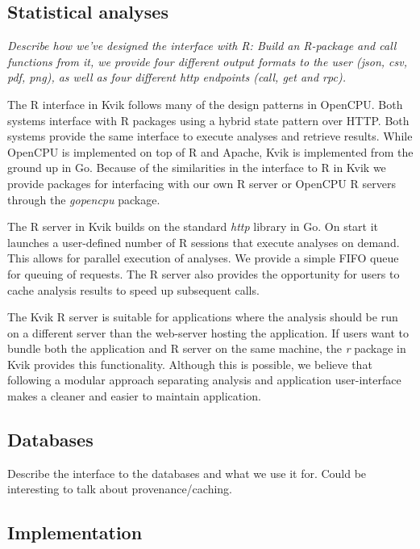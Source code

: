 \subsection*{Statistical analyses}
\emph{Describe how we've designed the interface with R: Build an R-package and
call functions from it, we provide four different output formats to the user
(json, csv, pdf, png),  as well as four different http endpoints (call, get and
rpc).}

The R interface in Kvik follows many of the design patterns in OpenCPU. Both
systems interface with R packages using a hybrid state pattern over HTTP. Both
systems provide the same interface to execute analyses and retrieve results.
While OpenCPU is implemented on top of R and Apache, Kvik is implemented from
the ground up in Go. Because of the similarities in the interface to R in Kvik
we provide packages for interfacing with our own R server or OpenCPU R servers
through the \emph{gopencpu} package. 

The R server in Kvik builds on the standard \emph{http} library in Go. On start
it launches a user-defined number of R sessions that execute analyses on demand.
This allows for parallel execution of analyses. We provide a simple FIFO queue
for queuing of requests. The R server also provides the opportunity for users to
cache analysis results to speed up subsequent calls. 

The Kvik R server is suitable for applications where the analysis should be run
on a different server than the web-server hosting the application. If users want
to bundle both the application and R server on the same machine, the \emph{r}
package in Kvik provides this functionality. Although this is possible, we
believe that following a modular approach separating analysis and
application user-interface makes a cleaner and easier to maintain application. 

\subsection*{Databases}
Describe the interface to the databases and what we use it for. Could be
interesting to talk about provenance/caching.

\subsection*{Implementation}

